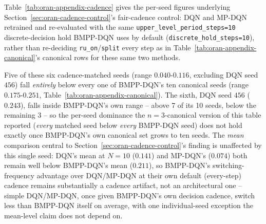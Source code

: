 Table~\ref{tab:oran-appendix-cadence} gives the per-seed figures
underlying Section~\ref{sec:oran-cadence-control}'s fair-cadence control:
DQN and MP-DQN retrained and re-evaluated with the same
\texttt{upper\_level\_period\_steps=10} discrete-decision hold BMPP-DQN
uses by default (\texttt{discrete\_hold\_steps=10}), rather than
re-deciding \texttt{ru\_on}/\texttt{split} every step as in
Table~\ref{tab:oran-appendix-canonical}'s canonical rows for these same
two methods.

\begin{table}[htbp]
\centering
\caption{Per-seed final evaluation metrics, fair-cadence control: DQN and
  MP-DQN retrained with BMPP-DQN's own $N=10$ discrete hold.}
\label{tab:oran-appendix-cadence}
\end{table}

Five of these six cadence-matched seeds (range $0.040$-$0.116$, excluding
DQN seed $456$) fall \emph{entirely} below every one of BMPP-DQN's ten
canonical seeds (range $0.175$-$0.251$, Table~\ref{tab:oran-appendix-canonical}).
The sixth, DQN seed $456$ ($0.243$), falls inside BMPP-DQN's own range --
above 7 of its 10 seeds, below the remaining 3 -- so the per-seed
dominance the $n=3$-canonical version of this table reported
(\emph{every} matched seed below \emph{every} BMPP-DQN seed) does not
hold exactly once BMPP-DQN's own canonical set grows to ten seeds. The
\emph{mean} comparison central to Section~\ref{sec:oran-cadence-control}'s
finding is unaffected by this single seed: DQN's mean at $N=10$
($0.141$) and MP-DQN's ($0.074$) both remain well below BMPP-DQN's mean
($0.211$), so BMPP-DQN's switching-frequency advantage over DQN/MP-DQN
at their own default (every-step) cadence remains substantially a
cadence artifact, not an architectural one -- simple DQN/MP-DQN, once
given BMPP-DQN's own decision cadence, switch less than BMPP-DQN itself
on average, with one individual-seed exception the mean-level claim does
not depend on.
